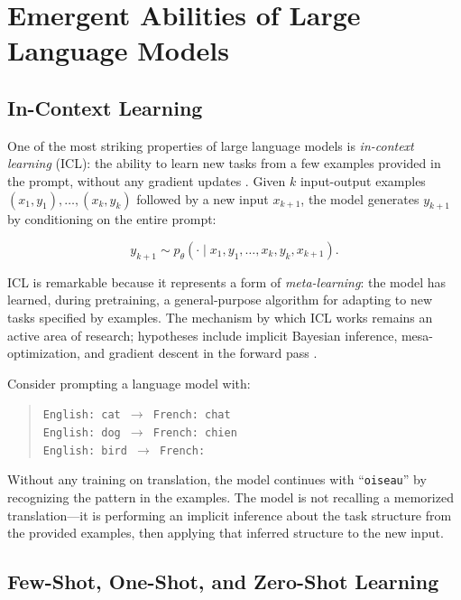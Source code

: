 \section{Emergent Abilities of Large Language Models}
\label{sec:emergent}

\subsection{In-Context Learning}

One of the most striking properties of large language models is \emph{in-context learning} (ICL): the ability to learn new tasks from a few examples provided in the prompt, without any gradient updates \citep{brown2020}. Given $k$ input-output examples $(x_1, y_1), \ldots, (x_k, y_k)$ followed by a new input $x_{k+1}$, the model generates $y_{k+1}$ by conditioning on the entire prompt:

\begin{equation}
y_{k+1} \sim p_\theta(\cdot \mid x_1, y_1, \ldots, x_k, y_k, x_{k+1}).
\label{eq:icl}
\end{equation}

ICL is remarkable because it represents a form of \emph{meta-learning}: the model has learned, during pretraining, a general-purpose algorithm for adapting to new tasks specified by examples. The mechanism by which ICL works remains an active area of research; hypotheses include implicit Bayesian inference, mesa-optimization, and gradient descent in the forward pass \citep{akyurek2023}.

\begin{example}
Consider prompting a language model with:
\begin{quote}
\texttt{English: cat $\rightarrow$ French: chat} \\
\texttt{English: dog $\rightarrow$ French: chien} \\
\texttt{English: bird $\rightarrow$ French:}
\end{quote}
Without any training on translation, the model continues with ``\texttt{oiseau}'' by recognizing the pattern in the examples. The model is not recalling a memorized translation---it is performing an implicit inference about the task structure from the provided examples, then applying that inferred structure to the new input.
\end{example}

\subsection{Few-Shot, One-Shot, and Zero-Shot Learning}

